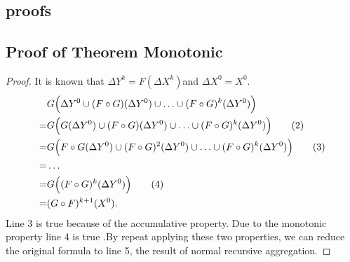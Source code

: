 \begin{appendix}
\section{proofs}
\subsection{Proof of Theorem Monotonic}

\begin{proof}
	\label{sec:app:proof:monotonic}
	It is known that $\Delta Y^k=F(\Delta X^k)$and $\Delta X^0=X^0$.
	\begin{align}
	&G\Big(\Delta Y^0\cup (F\circ G)(\Delta Y^0)\cup\ldots\cup (F\circ G)^k(\Delta Y^0)\Big)\notag \\
	=&G\Big(G(\Delta Y^0)\cup (F\circ G)(\Delta Y^0)\cup \ldots \cup (F\circ G)^k( \Delta Y^0)\Big)\tag{2}\\
	=&G\Big(F\circ G(\Delta Y^0)\cup (F\circ G)^2(\Delta Y^0)\cup \ldots \cup (F\circ G)^k(\Delta Y^0)\Big) \tag{3}\\
	=& \ldots \notag \\
	=&G\Big((F\circ G)^k(\Delta Y^0)\Big)\tag{4}\\
	=&(G \circ F)^{k+1}(X^0).\notag
	\end{align}
	Line 3 is true because of the accumulative property. Due to the monotonic property line 4 is true .By repeat applying these two properties, we can reduce the original formula to line 5, the result of normal recursive aggregation. 
\end{proof}


\end{appendix}
